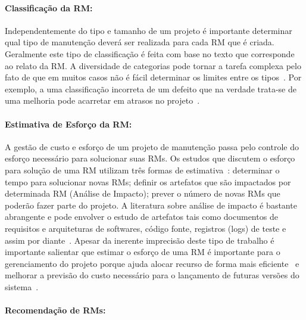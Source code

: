 \paragraph{Classificação da RM:}

Independentemente do tipo e tamanho de um projeto é importante determinar qual
tipo de manutenção deverá ser realizada para cada RM que é criada. Geralmente
este tipo de classificação é feita com base no texto que corresponde ao relato
da RM\@. A diversidade de categorias pode tornar a tarefa complexa pelo fato de
que em muitos casos não é fácil determinar os limites entre os
tipos~\cite{antoniol2008bug}. Por exemplo, a uma classificação incorreta de um
defeito que na verdade trata-se de uma melhoria pode acarretar em atrasos no
projeto~\cite{cavalcanti2014challenges}.

\paragraph{Estimativa de Esforço da RM:}

A gestão de custo e esforço de um projeto de manutenção passa pelo controle do
esforço necessário para solucionar suas RMs. Os estudos que discutem o esforço
para solução de uma RM utilizam três formas de
estimativa~\cite{cavalcanti2014challenges}: determinar o tempo para solucionar
novas RMs; definir os artefatos que são impactados por determinada RM (Análise
de Impacto); prever o número de novas RMs que poderão fazer parte do projeto. A
literatura sobre análise de impacto é bastante abrangente e pode envolver o
estudo de artefatos tais como documentos de requisitos e arquiteturas de
softwares, código fonte, registros (logs) de teste e assim por
diante~\cite{cavalcanti2014challenges}.  Apesar da inerente imprecisão deste
tipo de trabalho é importante salientar que estimar o esforço de uma RM é
importante para o gerenciamento do projeto porque ajuda alocar recurso de forma
mais eficiente~\cite{Bhattacharya:2011:BTP:1985441.1985472} e melhorar a
previsão do custo necessário para o lançamento de futuras versões do
sistema~\cite{Vijayakumar2014}.

\paragraph{Recomendação de RMs:}

